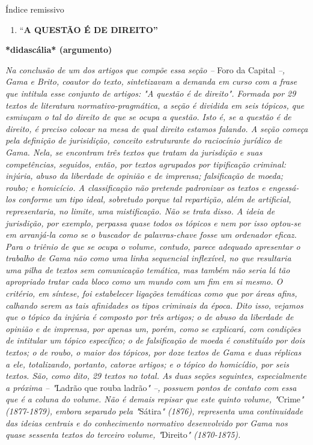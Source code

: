 Índice remissivo

\begin{enumerate}
\item
  \protect\hypertarget{Secao_Sem_Titulo-1}{}{}``\textbf{A QUESTÃO É DE
  DIREITO''}
\end{enumerate}

\textbf{*didascália* (argumento)}

\emph{Na conclusão de um dos artigos que compõe essa seção --} Foro da
Capital \emph{--, Gama e Brito, coautor do texto, sintetizavam a demanda
em curso com a frase que intitula esse conjunto de artigos: "A questão é
de direito". Formada por 29 textos de literatura normativo-pragmática, a
seção é dividida em seis tópicos, que esmiuçam o tal do direito de que
se ocupa a questão. Isto é, se a questão é de direito, é preciso colocar
na mesa de qual direito estamos falando. A seção começa pela definição
de jurisidição, conceito estruturante do raciocínio jurídico de Gama.
Nela, se encontram três textos que tratam da jurisdição e suas
competências, seguidos, então, por textos agrupados por tipificação
criminal: injúria, abuso da liberdade de opinião e de imprensa;
falsificação de moeda; roubo; e homicício. A classificação não pretende
padronizar os textos e engessá-los conforme um tipo ideal, sobretudo
porque tal repartição, além de artificial, representaria, no limite, uma
mistificação. Não se trata disso. A ideia de jurisdição, por exemplo,
perpassa quase todos os tópicos e nem por isso optou-se em arranjá-la
como se o buscador de palavras-chave fosse um ordenador eficaz. Para o
triênio de que se ocupa o volume, contudo, parece adequado apresentar o
trabalho de Gama não como uma linha sequencial inflexível, no que
resultaria uma pilha de textos sem comunicação temática, mas também não
seria lá tão apropriado tratar cada bloco como um mundo com um fim em si
mesmo. O critério, em síntese, foi estabelecer ligações temáticas como
que por áreas afins, calhando serem as tais afinidades os tipos
criminais da época. Dito isso, vejamos que o tópico da injúria é
composto por três artigos; o de abuso da liberdade de opinião e de
imprensa, por apenas um, porém, como se explicará, com condições de
intitular um tópico específico; o de falsificação de moeda é constituído
por dois textos; o de roubo, o maior dos tópicos, por doze textos de
Gama e duas réplicas a ele, totalizando, portanto, catorze artigos; e o
tópico do homicídio, por seis textos. São, como dito, 29 textos no
total. As duas seções seguintes, especialmente a próxima -- "}Ladrão que
rouba ladrão\emph{" --, possuem pontos de contato com essa que é a
coluna do volume. Não é demais repisar que este quinto volume,
"}Crime\emph{" (1877-1879), embora separado pela "}Sátira\emph{" (1876),
representa uma continuidade das ideias centrais e do conhecimento
normativo desenvolvido por Gama nos quase sessenta textos do terceiro
volume, "}Direito\emph{" (1870-1875). }


